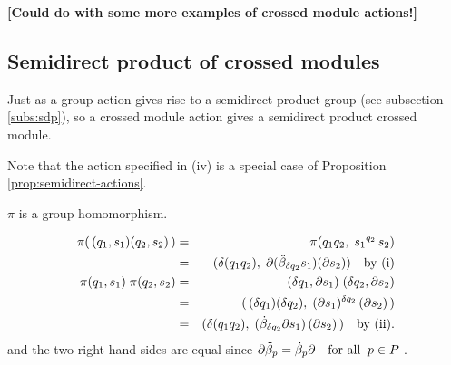 \vspace{3mm}
\noindent
{\bf [Could do with some more examples of crossed module actions!]}
\vspace{3mm}


\subsection{Semidirect product of crossed modules} 
\label{subs:sdp-xmod}

Just as a group action gives rise to a semidirect product group 
(see subsection \ref{subs:sdp}),
so a crossed module action gives a semidirect product crossed module.

Note that the action specified in (iv) is a special case of 
Proposition \ref{prop:semidirect-actions}.

\begin{lem}
$\pi$ is a group homomorphism.
\end{lem}
\begin{pf}
\begin{eqnarray*}
\pi(\,(q_1,s_1)(q_2,s_2)\,)  &  =  &
   \pi( q_1q_2,\; {s_1}^{q_2}\,s_2)  \\
 & = &
   (\delta (q_1 q_2),\; 
      \partial(\ddot{\beta}_{\delta q_2}s_1)(\partial s_2) ) \quad \mbox{by (i)} \\
\pi(q_1,s_1)\;\pi(q_2,s_2)  & = &
   (\delta q_1, \partial s_1)\;(\delta q_2, \partial s_2)  \\
 & = &
   (\,(\delta q_1)(\delta q_2),\;
      (\partial s_1)^{\delta q_2}\,(\partial s_2)\,) \\
 & = &
   (\delta(q_1q_2),\; (\dot{\beta}_{\delta q_2} \partial s_1)\,(\partial s_2)\,)
       \quad \mbox{by (ii)}.
\end{eqnarray*}
and the two right-hand sides are equal since 
$\partial\ddot{\beta}_p = \dot{\beta}_p\partial \quad \mbox{for all} \;\; p \in P\;$.
\end{pf}


